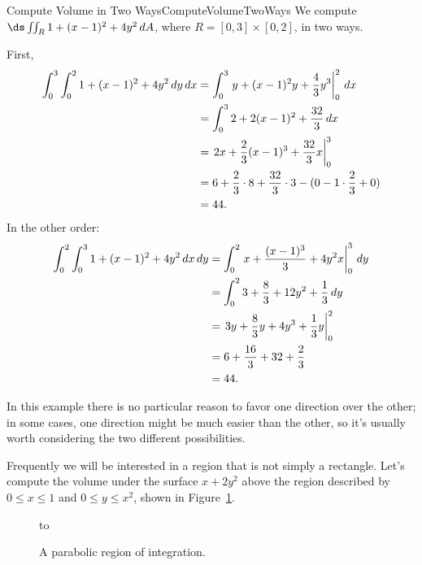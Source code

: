 \begin{example}{Compute Volume in Two Ways}{ComputeVolumeTwoWays}
We compute $\ds\iint_R 1+(x-1)^2+4y^2\,dA$, where
$R=[0,3]\times[0,2]$, in two ways.
\end{example}
\begin{solution}
First,
\begin{align*}
\int_0^3\int_0^2 1+(x-1)^2+4y^2\,dy\,dx
&=\int_0^3\left. y+(x-1)^2y+{4\over 3}y^3\right|_0^2\,dx	\\
&=\int_0^3 2+2(x-1)^2+{32\over 3}\,dx	\\
&=\left. 2x + {2\over 3}(x-1)^3+{32\over 3}x\right|_0^3	\\
&=6+{2\over 3}\cdot 8 + {32\over 3}\cdot3-(0-1\cdot{2\over3}+0)	\\
&=44.
\end{align*}
In the other order:
\begin{align*}
\int_0^2\int_0^3 1+(x-1)^2+4y^2\,dx\,dy
&=\int_0^2\left. x+{(x-1)^3\over3}+4y^2x\right|_0^3\,dy	\\
&=\int_0^2 3+{8\over3}+12y^2+{1\over3}\,dy	\\
&=\left. 3y+{8\over3}y+4y^3+{1\over3}y\right|_0^2	\\
&=6+{16\over3}+32+{2\over3}	\\
&=44.
\end{align*}
\end{solution}

In this example there is no particular reason to favor one direction
over the other; in some cases, one direction might be much easier than
the other, so it's usually worth considering the two different
possibilities. 

Frequently we will be interested in a region that is not simply a
rectangle. Let's compute the volume under the surface $x+2y^2$ above
the region described by $0\le x\le1$ and $0\le y\le x^2$, shown in
Figure~\ref{fig:parabolicregion}.

\begin{figure}[H]
\hbox to 
\caption{A parabolic region of integration.}
\label{fig:parabolicregion}
\end{figure}

